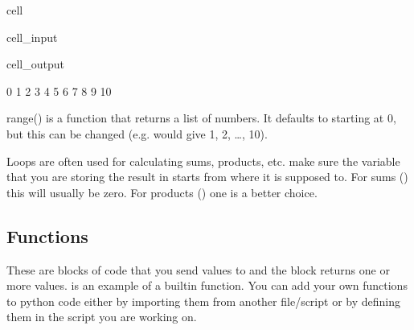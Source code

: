 \documentclass[letterpaper,10pt,english]{jupyterBook}
\begin{document}
\begin{sphinxuseclass}{cell}\begin{sphinxVerbatimInput}

\begin{sphinxuseclass}{cell_input}
\begin{sphinxVerbatim}[commandchars=\\\{\}]
   
\end{sphinxVerbatim}

\end{sphinxuseclass}\end{sphinxVerbatimInput}
\begin{sphinxVerbatimOutput}

\begin{sphinxuseclass}{cell_output}
\begin{sphinxVerbatim}[commandchars=\\\{\}]
0
1
2
3
4
5
6
7
8
9
10
\end{sphinxVerbatim}

\end{sphinxuseclass}\end{sphinxVerbatimOutput}

\end{sphinxuseclass}
\sphinxAtStartPar
range() is a function that returns a list of numbers. It defaults to starting at 0, but this can be changed (e.g.  would give 1, 2, …, 10).

\sphinxAtStartPar
{} Loops are often used for calculating sums, products, etc. make sure the variable that you are storing the result in starts from where it is supposed to. For sums () this will usually be zero. For products () one is a better choice.


\subsection{Functions}
\label{\detokenize{ProgInPython:functions}}
\sphinxAtStartPar
These are blocks of code that you send values to and the block returns one or more values.  is an example of a built\sphinxhyphen{}in function. You can add your own functions to python code either by importing them from another file/script or by defining them in the script you are working on.
\end{document}
